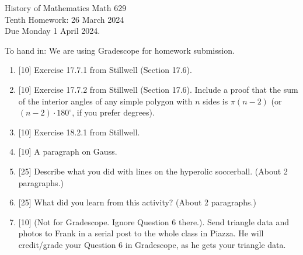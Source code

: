 \documentclass[12pt]{article}
\begin{document}
\LARGE 
\noindent
{\color{Maroon}History of Mathematics \hfill Math 629}\vspace{2pt}\\
\large
Tenth Homework: \hfill 26 March 2024\\
Due Monday 1 April 2024.
\normalsize\vspace{10pt}

To hand in: We are using Gradescope for homework submission.


\begin{enumerate}

\item  {[10]}
     Exercise 17.7.1 from Stillwell (Section 17.6).
\item  {[10]}
  Exercise 17.7.2 from Stillwell (Section 17.6).
  Include a proof that the sum of the interior angles of any simple polygon with $n$ sides is $\pi(n-2)$ (or $(n-2)\cdot 180^\circ$,
  if you prefer degrees).

\item  {[10]}
  Exercise 18.2.1 from Stillwell.
  
\item{[10]} A paragraph on Gauss.

\item  {[25]}
     Describe what you did with lines on the hyperolic soccerball.  (About 2 paragraphs.)
\item  {[25]}
       What did you learn from this activity?  (About 2 paragraphs.)
\item {[10]}
  (Not for Gradescope. Ignore Question 6 there.).  Send triangle data and photos to Frank in a serial post to the whole class in Piazza.
  He will credit/grade your Question 6 in Gradescope, as he gets your triangle data.


  \end{enumerate}
\end{document}
